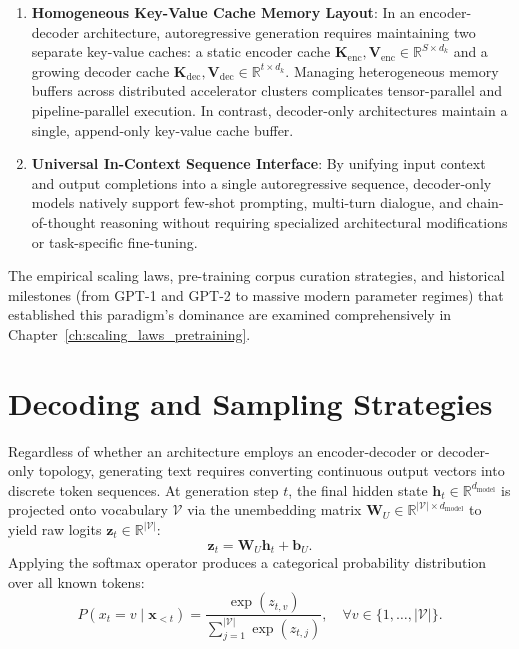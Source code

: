 \documentclass[../../main.tex]{subfiles}
\begin{document}
\begin{enumerate}
    \item \textbf{Homogeneous Key-Value Cache Memory Layout}: In an encoder-decoder architecture, autoregressive generation requires maintaining two separate key-value caches: a static encoder cache $\mathbf{K}_{\text{enc}}, \mathbf{V}_{\text{enc}} \in \mathbb{R}^{S \times d_k}$ and a growing decoder cache $\mathbf{K}_{\text{dec}}, \mathbf{V}_{\text{dec}} \in \mathbb{R}^{t \times d_k}$. Managing heterogeneous memory buffers across distributed accelerator clusters complicates tensor-parallel and pipeline-parallel execution. In contrast, decoder-only architectures maintain a single, append-only key-value cache buffer.
    
    \item \textbf{Universal In-Context Sequence Interface}: By unifying input context and output completions into a single autoregressive sequence, decoder-only models natively support few-shot prompting, multi-turn dialogue, and chain-of-thought reasoning without requiring specialized architectural modifications or task-specific fine-tuning.
\end{enumerate}

The empirical scaling laws, pre-training corpus curation strategies, and historical milestones (from GPT-1 and GPT-2 to massive modern parameter regimes) that established this paradigm's dominance are examined comprehensively in Chapter~\ref{ch:scaling_laws_pretraining}.


\section{Decoding and Sampling Strategies}
\label{sec:decoding_and_sampling}

Regardless of whether an architecture employs an encoder-decoder or decoder-only topology, generating text requires converting continuous output vectors into discrete token sequences. At generation step $t$, the final hidden state $\mathbf{h}_t \in \mathbb{R}^{d_{\text{model}}}$ is projected onto vocabulary $\mathcal{V}$ via the unembedding matrix $\mathbf{W}_U \in \mathbb{R}^{|\mathcal{V}| \times d_{\text{model}}}$ to yield raw logits $\mathbf{z}_t \in \mathbb{R}^{|\mathcal{V}|}$:
\begin{equation}
\mathbf{z}_t = \mathbf{W}_U \mathbf{h}_t + \mathbf{b}_U.
\label{eq:unembedding_projection_formal}
\end{equation}
Applying the softmax operator produces a categorical probability distribution over all known tokens:
\begin{equation}
P(x_t = v \mid \mathbf{x}_{<t}) = \frac{\exp(z_{t,v})}{\sum_{j=1}^{|\mathcal{V}|} \exp(z_{t,j})}, \quad \forall v \in \{1, \dots, |\mathcal{V}|\}.
\label{eq:unembedding_softmax_distribution}
\end{equation}
\end{document}
